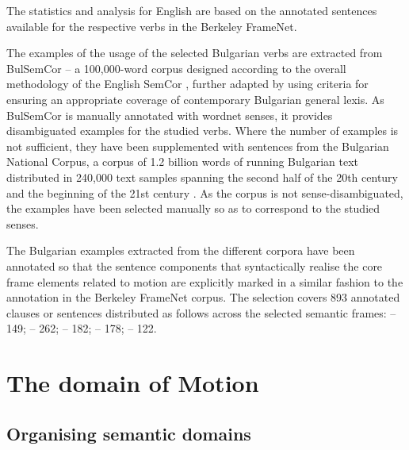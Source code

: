 \documentclass[output=paper,colorlinks,citecolor=brown]{langscibook}
\begin{document}
The statistics and analysis for English are based on the annotated sentences available for the respective verbs in the Berkeley FrameNet. 

The examples of the usage of the selected Bulgarian verbs are extracted from BulSemCor \citep{koeva-2006-bulsemcor,koeva-2011-bulsemcor} -- a 100,000-word corpus designed according to the overall methodology of the English SemCor \citep{miller-etal-1993-semantic,miller-etal-1994-using,landes1998}, further adapted by using criteria for ensuring an appropriate coverage of contemporary Bulgarian general lexis. As BulSemCor is manually annotated with wordnet senses, it provides disambiguated examples for the studied verbs. Where the number of examples is not sufficient, they have been supplemented with sentences from the Bulgarian National Corpus, a corpus of 1.2 billion words of running Bulgarian text distributed in 240,000 text samples spanning the second half of the 20th century and the beginning of the 21st century \citep{Koeva2012}. As the corpus is not sense-disambiguated, the examples have been selected manually so as to correspond to the studied senses. 

The Bulgarian examples extracted from the different corpora have been annotated so that the sentence components that syntactically realise the core frame elements related to motion are explicitly marked in a similar fashion to the annotation in the Berkeley FrameNet corpus. The selection covers 893 annotated clauses or sentences distributed as follows across the selected semantic frames:  -- 149;  -- 262;  -- 182;  -- 178;  -- 122.


\section{The domain of Motion}

\subsection{Organising semantic domains}
\end{document}
